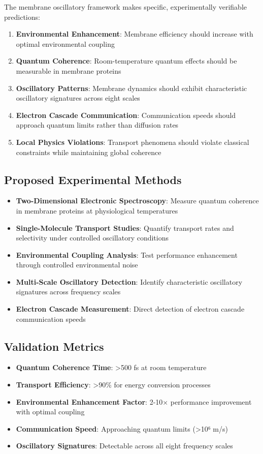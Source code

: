 \documentclass[12pt,a4paper]{article}
\begin{document}
The membrane oscillatory framework makes specific, experimentally verifiable predictions:

\begin{enumerate}
\item \textbf{Environmental Enhancement}: Membrane efficiency should increase with optimal environmental coupling
\item \textbf{Quantum Coherence}: Room-temperature quantum effects should be measurable in membrane proteins
\item \textbf{Oscillatory Patterns}: Membrane dynamics should exhibit characteristic oscillatory signatures across eight scales
\item \textbf{Electron Cascade Communication}: Communication speeds should approach quantum limits rather than diffusion rates
\item \textbf{Local Physics Violations}: Transport phenomena should violate classical constraints while maintaining global coherence
\end{enumerate}

\subsection{Proposed Experimental Methods}

\begin{itemize}
\item \textbf{Two-Dimensional Electronic Spectroscopy}: Measure quantum coherence in membrane proteins at physiological temperatures
\item \textbf{Single-Molecule Transport Studies}: Quantify transport rates and selectivity under controlled oscillatory conditions
\item \textbf{Environmental Coupling Analysis}: Test performance enhancement through controlled environmental noise
\item \textbf{Multi-Scale Oscillatory Detection}: Identify characteristic oscillatory signatures across frequency scales
\item \textbf{Electron Cascade Measurement}: Direct detection of electron cascade communication speeds
\end{itemize}

\subsection{Validation Metrics}

\begin{itemize}
\item \textbf{Quantum Coherence Time}: >500 fs at room temperature
\item \textbf{Transport Efficiency}: >90\% for energy conversion processes
\item \textbf{Environmental Enhancement Factor}: 2-10× performance improvement with optimal coupling
\item \textbf{Communication Speed}: Approaching quantum limits (>10⁶ m/s)
\item \textbf{Oscillatory Signatures}: Detectable across all eight frequency scales
\end{itemize}
\end{document}
